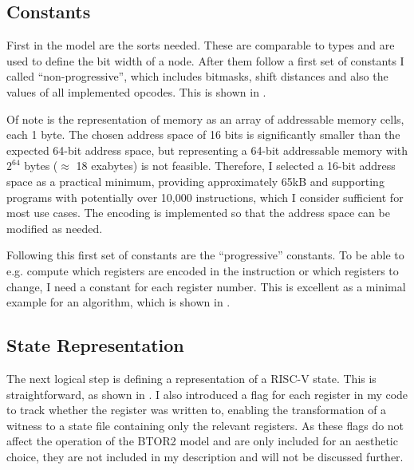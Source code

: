 \subsection{Constants}
First in the model are the sorts needed. These are comparable to
types and are used to define the bit width of a node. After them
follow a first set of constants I called \enquote{non-progressive},
which includes bitmasks, shift distances and also the values of all
implemented opcodes. This is shown in .

Of note is the representation of memory as an array of addressable
memory cells, each 1 byte. The chosen address space of 16 bits is
significantly smaller than the expected 64-bit address space, but
representing a 64-bit addressable memory with $2^{64}$ bytes
($\approx$ 18 exabytes) is not feasible. Therefore, I selected a
16-bit address space as a practical minimum, providing approximately
65kB and supporting programs with potentially over 10,000
instructions, which I consider sufficient for most use cases. The
encoding is implemented so that the address space can be modified as
needed.

Following this first set of constants are the \enquote{progressive}
constants. To be able to e.g. compute which registers are encoded in
the instruction or which registers to change, I need a constant for
each register number. This is excellent as a minimal example for an
algorithm, which is shown in .





\subsection{State Representation}
The next logical step is defining a representation of a RISC-V state.
This is straightforward, as shown in . I also
introduced a flag for each register in my code to track whether the
register was written to, enabling the transformation of a witness to
a state file containing only the relevant registers. As these flags
do not affect the operation of the BTOR2 model and are only included
for an aesthetic choice, they are not included in my description and
will not be discussed further.


